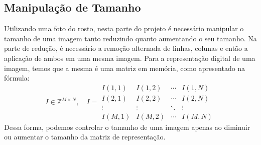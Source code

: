 \documentclass[conference]{IEEEtran}
\begin{document}
\subsection{Manipulação de Tamanho}
Utilizando uma foto do rosto, nesta parte do projeto é necessário manipular o tamanho de uma imagem tanto reduzindo quanto aumentando o seu tamanho.
Na parte de redução, é necessário a remoção alternada de linhas, colunas e então a aplicação de ambos em uma mesma imagem.
Para a representação digital de uma imagem, temos que a mesma é uma matriz em memória, como apresentado na fórmula:
\begin{equation}
    \label{math:matrix_full}
    I \in \mathbb{Z}^{M \times N}, \quad
    I = \begin{smallmatrix}
    I(1,1) & I(1,2) & \cdots & I(1,N) \\
    I(2,1) & I(2,2) & \cdots & I(2,N) \\
    \vdots  & \vdots  & \ddots & \vdots  \\
    I(M,1) & I(M,2) & \cdots & I(M,N)
    \end{smallmatrix}
\end{equation}
Dessa forma, podemos controlar o tamanho de uma imagem apenas ao diminuir ou aumentar o tamanho da matriz de representação.
\end{document}
